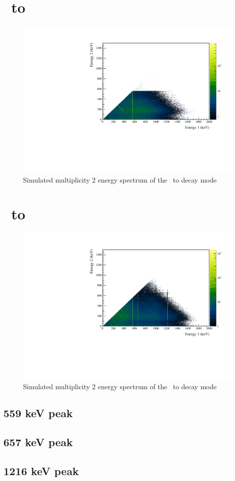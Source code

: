 \documentclass[/main.tex]{subfiles}
\begin{document}

\section{\tnbb\ to }
\begin{figure}[!htb]
  \centering
  \includegraphics[width=.8\linewidth]{ESsim_2vBB_ES2_1}
  \caption[Simulation of \tnbb\ to ]{
    Simulated multiplicity 2 energy spectrum of the \tnbb\ to  decay mode}
\end{figure}


\section{\tnbb\ to }
\begin{figure}[!htb]
  \centering
  \includegraphics[width=.8\linewidth]{ESsim_2vBB_ES2_2}
  \caption[Simulation of \tnbb\ to ]{
    Simulated multiplicity 2 energy spectrum of the \tnbb\ to  decay mode}
\end{figure}

\subsection{559 keV peak}
\subsection{657 keV peak}
\subsection{1216 keV peak}
\end{document}
